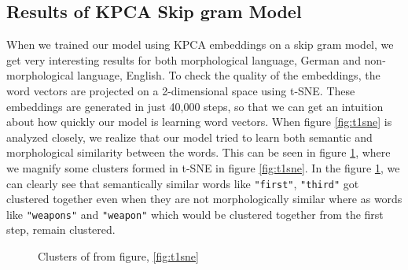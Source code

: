  \subsection{Results of KPCA Skip gram Model}
 When we trained our model using KPCA embeddings on a skip gram model, we get very interesting results for both morphological language, German and non-morphological language, English. To check the quality of the embeddings, the word vectors are projected on a 2-dimensional space using t-SNE. These embeddings are generated in just 40,000 steps, so that we can get an intuition about how quickly our model is learning word vectors. When figure \ref{fig:t1sne} is analyzed closely, we realize that our model tried to learn both semantic and morphological similarity between the words. This can be seen in figure \ref{fig:focusOfkpcaSm}, where we magnify some clusters formed in t-SNE in figure \ref{fig:t1sne}. In the figure \ref{fig:focusOfkpcaSm}, we can clearly see that semantically similar words like \texttt{"first"}, \texttt{"third"} got clustered together even when they are not morphologically similar where as words like \texttt{"weapons"} and \texttt{"weapon"} which would be clustered together from the first step, remain clustered.
\begin{figure}[H]
	\centering
	\caption{Clusters of from figure, \ref{fig:t1sne}}
	\label{fig:focusOfkpcaSm}
\end{figure}
